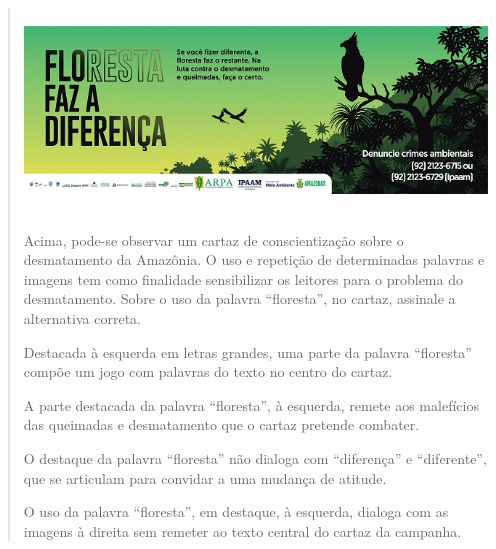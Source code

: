 \begin{quote}
\includegraphics[width=5.90551in,height=2.125in]{./imgSAEB_7_POR/media/image16.png}


Acima, pode-se observar um cartaz de conscientização sobre o desmatamento da
Amazônia. O uso e repetição de determinadas palavras e imagens tem como
finalidade sensibilizar os leitores para o problema do desmatamento.
Sobre o uso da palavra ``floresta'', no cartaz, assinale a alternativa
correta.

\begin{escolha}

  \item Destacada à esquerda em letras grandes, uma parte da palavra ``floresta'' compõe um jogo com 
  palavras do texto no centro do cartaz.   

  \item A parte destacada da palavra ``floresta'', à esquerda, remete aos malefícios das queimadas e desmatamento
  que o cartaz pretende combater. 

  \item O destaque da palavra ``floresta'' não dialoga com ``diferença'' e ``diferente'', que se articulam para convidar a uma mudança de atitude.

  \item O uso da palavra ``floresta'', em destaque, à esquerda, dialoga com as imagens à direita sem remeter ao texto central do cartaz da campanha. 

\end{escolha}

\end{quote}
